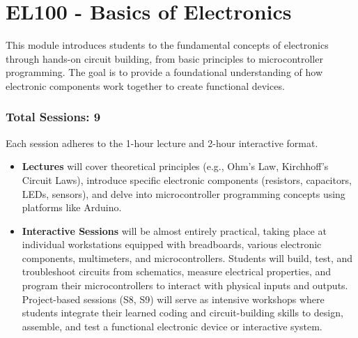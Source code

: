 
\section{EL100 - Basics of Electronics}
\addtocounter{section}{4}%

\begin{tcolorbox}[boxstyle, title={Module Overview}]
    This module introduces students to the fundamental concepts of electronics through hands-on circuit building, from basic principles to microcontroller programming. The goal is to provide a foundational understanding of how electronic components work together to create functional devices.
\end{tcolorbox}

\subsubsection*{Total Sessions: 9}

\begin{tcolorbox}[boxstyle, title={Session Structure}]
    Each session adheres to the 1-hour lecture and 2-hour interactive format.
    \begin{itemize}
        \item \textbf{Lectures} will cover theoretical principles (e.g., Ohm's Law, Kirchhoff's Circuit Laws), introduce specific electronic components (resistors, capacitors, LEDs, sensors), and delve into microcontroller programming concepts using platforms like Arduino.
        \item \textbf{Interactive Sessions} will be almost entirely practical, taking place at individual workstations equipped with breadboards, various electronic components, multimeters, and microcontrollers. Students will build, test, and troubleshoot circuits from schematics, measure electrical properties, and program their microcontrollers to interact with physical inputs and outputs. Project-based sessions (S8, S9) will serve as intensive workshops where students integrate their learned coding and circuit-building skills to design, assemble, and test a functional electronic device or interactive system.
    \end{itemize}
\end{tcolorbox}



